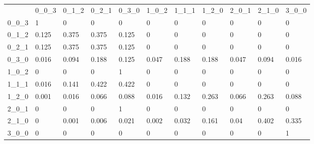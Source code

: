 \documentclass{article}
\begin{document}
\begin{table}[h!]
\begin{tabular}{lllllllllll}
        & 0\_0\_3 & 0\_1\_2 & 0\_2\_1 & 0\_3\_0 & 1\_0\_2 & 1\_1\_1 & 1\_2\_0 & 2\_0\_1 & 2\_1\_0 & 3\_0\_0 \\
0\_0\_3 & 1       & 0       & 0       & 0       & 0       & 0       & 0       & 0       & 0       & 0       \\
0\_1\_2 & 0.125   & 0.375   & 0.375   & 0.125   & 0       & 0       & 0       & 0       & 0       & 0       \\
0\_2\_1 & 0.125   & 0.375   & 0.375   & 0.125   & 0       & 0       & 0       & 0       & 0       & 0       \\
0\_3\_0 & 0.016   & 0.094   & 0.188   & 0.125   & 0.047   & 0.188   & 0.188   & 0.047   & 0.094   & 0.016   \\
1\_0\_2 & 0       & 0       & 0       & 1       & 0       & 0       & 0       & 0       & 0       & 0       \\
1\_1\_1 & 0.016   & 0.141   & 0.422   & 0.422   & 0       & 0       & 0       & 0       & 0       & 0       \\
1\_2\_0 & 0.001   & 0.016   & 0.066   & 0.088   & 0.016   & 0.132   & 0.263   & 0.066   & 0.263   & 0.088   \\
2\_0\_1 & 0       & 0       & 0       & 1       & 0       & 0       & 0       & 0       & 0       & 0       \\
2\_1\_0 & 0       & 0.001   & 0.006   & 0.021   & 0.002   & 0.032   & 0.161   & 0.04    & 0.402   & 0.335   \\
3\_0\_0 & 0       & 0       & 0       & 0       & 0       & 0       & 0       & 0       & 0       & 1      
\end{tabular}
\end{table}
\end{document}
